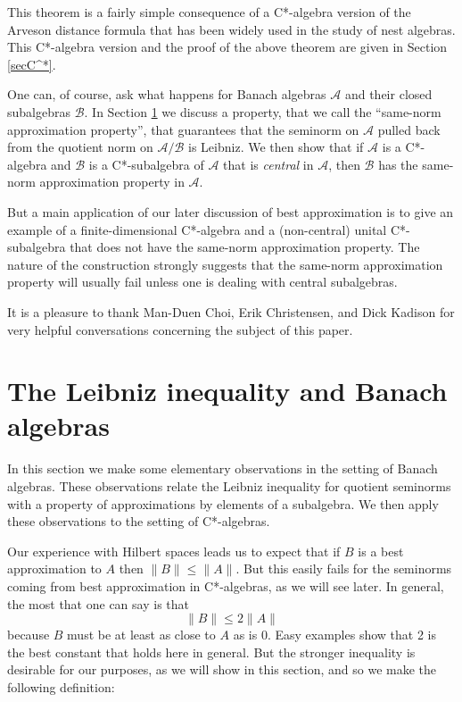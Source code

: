 \documentclass[12pt]{amsart}
\newcommand{\<}{\langle}
\renewcommand{\>}{\rangle}
\newcommand{\cA}{{\mathcal A}}
\newcommand{\cB}{{\mathcal B}}
\theoremstyle{definition}   %
\begin{document}
This theorem is a fairly simple consequence of a C*-algebra version of the
Arveson distance formula \cite{Arv} that has been widely used in the study of nest algebras. This C*-algebra version and the proof of the above theorem are given in Section \ref{secC^*}.

One can, of course, ask what happens for Banach algebras $\cA$ and their closed
subalgebras $\cB$. In Section \ref{sec1} we discuss a property, that we call the
``same-norm approximation property'', that guarantees that the seminorm on
$\cA$ pulled back from the quotient norm on $\cA/\cB$ is Leibniz. We then show
that if $\cA$ is a C*-algebra and $\cB$ is a C*-subalgebra of $\cA$ that is
\emph{central} in $\cA$, then $\cB$ has the same-norm approximation property
in $\cA$.

But a main application of our later discussion of best approximation is to
give an example of a finite-dimensional C*-algebra and a (non-central)
unital C*-subalgebra that does not have the same-norm approximation property. 
The nature
of the construction strongly suggests that the same-norm approximation
property will usually fail unless one is dealing with central subalgebras.

It is a pleasure to thank Man-Duen Choi, Erik Christensen, and Dick Kadison
for very helpful conversations concerning the subject of this paper.



\section{The Leibniz inequality and Banach algebras}
\label{sec1}

In this section we make some elementary observations in the setting of Banach algebras.
These observations relate the Leibniz inequality for quotient
seminorms with a property of approximations by elements of a subalgebra. We then
apply these observations to the setting of C*-algebras. 

Our experience with Hilbert spaces leads us to expect that if $B$ is a best
approximation to $A$ then $\|B\| \leq \|A\|$. But this easily fails for the seminorms coming
from best approximation in C*-algebras, as we will see later. In general, the most that one
can say is that 
\[
\|B\| \leq 2\|A\|
\]
because $B$ must be at least as close to $A$ as is $0$. Easy examples show that 2 is the
best constant that holds here in general. But the stronger inequality is desirable for our purposes,
as we will show in this section, and so we make the following definition:
\end{document}
